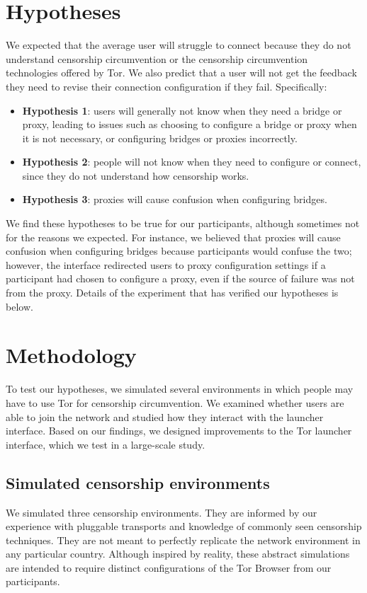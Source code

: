 \documentclass{template}
\begin{document}
\section{Hypotheses}
We expected that the average user will struggle to connect because they do not understand censorship circumvention or the  censorship circumvention technologies offered by Tor. We also predict that a user will not get the feedback they need to revise their connection configuration if they fail. Specifically: 

\begin{itemize} \itemsep1pt \parskip0pt 
\item  {\bfseries Hypothesis 1}: users will generally not know when they need a bridge or proxy, leading to issues such as choosing to configure a bridge or proxy when it is not necessary, or configuring bridges or proxies incorrectly.
\item  {\bfseries Hypothesis 2}: people will not know when they need to configure or connect, since they do not understand how censorship works.   
\item  {\bfseries Hypothesis 3}: proxies will cause confusion when configuring bridges. 
\end{itemize} 

We find these hypotheses to be true for our participants, although sometimes not for the reasons we expected. For instance, we believed that proxies will cause confusion when configuring bridges because participants would confuse the two; however, the interface redirected users to proxy configuration settings if a participant had chosen to configure a proxy, even if the source of failure was not from the proxy. Details of the experiment that has verified our hypotheses is below.

\section{Methodology}

To test our hypotheses, we simulated several environments in which people may
have to use Tor for censorship circumvention. We examined whether users are able
to join the network and studied how they interact with the launcher interface.
Based on our findings, we designed improvements to the Tor launcher interface,
which we test in a large-scale study.

\subsection{Simulated censorship environments}
We simulated three censorship environments.
They are informed by our experience with pluggable transports
and knowledge of commonly seen censorship techniques.
They are not meant to perfectly replicate the network environment
in any particular country. Although inspired by reality, these
abstract simulations are intended to require distinct configurations
of the Tor Browser from our participants.
\end{document}
